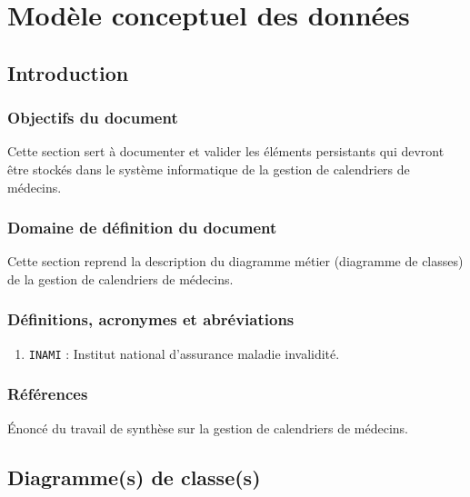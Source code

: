 \chapter{Modèle conceptuel des données}

\section{Introduction}

\subsection{Objectifs du document}

Cette section sert à documenter et valider les éléments persistants qui devront
être stockés dans le système informatique de la gestion de calendriers de médecins.

\subsection{Domaine de définition du document}

Cette section reprend la description du diagramme métier (diagramme de classes) de la gestion de 
calendriers de médecins.

\subsection{Définitions, acronymes et abréviations}

\begin{enumerate}

\item \texttt{INAMI} : Institut national d'assurance maladie invalidité.

\end{enumerate}

\subsection{Références}

Énoncé du travail de synthèse sur la gestion de calendriers de médecins.

\newpage
\section{Diagramme(s) de classe(s)}

